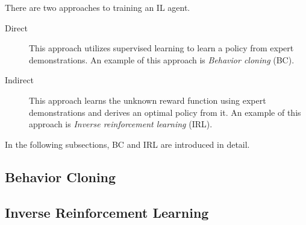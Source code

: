 There are two approaches to training an IL agent.

\begin{description}
  \item[Direct]
        This approach utilizes supervised learning to learn a policy from expert demonstrations.
        An example of this approach is \textit{Behavior cloning} (BC).

  \item[Indirect]
        This approach learns the unknown reward function using expert demonstrations and derives an optimal policy from it.
        An example of this approach is \textit{Inverse reinforcement learning} (IRL).
\end{description}

In the following subsections,
BC and IRL are introduced in detail.


\subsection{Behavior Cloning}


\subsection{Inverse Reinforcement Learning}

